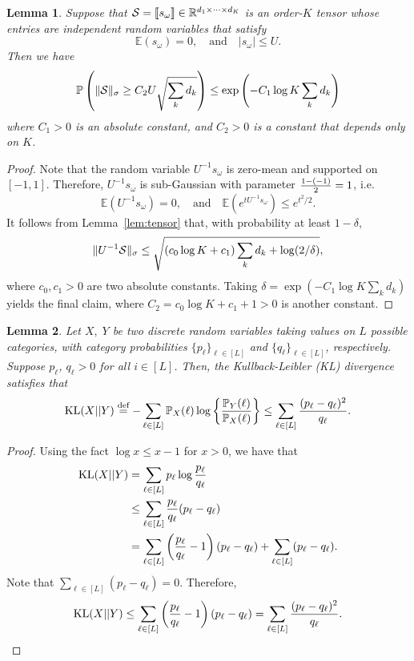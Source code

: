 \documentclass{article}
\theoremstyle{plain}
\newtheorem{lem}{Lemma}
\theoremstyle{definition}
\begin{document}
\begin{lem} \label{lem:noisytensor}
Suppose that $\mathcal{S}=\llbracket s_{\omega} \rrbracket\in\mathbb{R}^{d_1\times \cdots \times d_K}$ is an order-$K$ tensor whose entries are independent random variables that satisfy
\[
\mathbb{E}(s_{\omega})=0,\quad \text{and}\quad |s_{\omega}|\leq U.
\]
Then we have
\[
\mathbb{P}\left(\lVert\mathcal{S}\rVert_\sigma\geq C_2 U\sqrt{\sum_k d_k} \right)\leq \exp\left(-C_1  \log K \sum_k d_k\right)
\]
where $C_1>0$ is an absolute constant, and $C_2>0$ is a constant that depends only on $K$.
\end{lem}

\begin{proof}  Note that the random variable $U^{-1}s_{\omega}$ is zero-mean and supported on $[-1,1]$. Therefore, $U^{-1}s_{\omega}$ is sub-Gaussian with parameter ${1-(-1)\over 2}=1$, i.e.
\[
\mathbb{E}(U^{-1}s_{\omega})=0,\quad \text{and}\quad \mathbb{E}(e^{tU^{-1}s_{\omega}})\leq e^{t^2/2}.
\]
It follows from Lemma~\ref{lem:tensor} that, with probability at least $1-\delta$,
\[
\lVert U^{-1}\mathcal{S}\rVert_\sigma\leq \sqrt{\left(c_0\log K+c_1\right) \sum_k d_k +\log (2/\delta)},
\]
where $c_0, c_1>0$ are two absolute constants. Taking $\delta=\exp (-C_1\log K \sum_k d_k)$ yields the final claim, where $C_2=c_0\log K+c_1+1>0$ is another constant.
\end{proof}


\begin{lem}\label{lem:KLentry} Let $X,\; Y$ be two discrete random variables taking values on $L$ possible categories, with category probabilities $\{p_\ell\}_{\ell\in[L]}$ and $\{q_\ell\}_{\ell\in[L]}$, respectively.  Suppose $p_\ell$, $q_\ell>0$ for all $i\in[L]$. Then, the Kullback-Leibler (KL) divergence satisfies that
\[
\mathrm{KL}(X||Y)\stackrel{\text{def}}{=}-\sum_{\ell\in[L]}\mathbb{P}_X(\ell)\log\left\{{\mathbb{P}_Y(\ell)\over \mathbb{P}_X(\ell)}\right\} \leq \sum_{\ell \in [L]}{(p_\ell-q_\ell)^2 \over q_\ell}.
\]
\end{lem}
\begin{proof} Using the fact $\log x\leq x-1$ for $x>0$, we have that
\begin{align}\label{eq:KL}
\text{KL}(X||Y)&=\sum_{\ell\in[L]}p_\ell\log{p_\ell\over q_\ell}\\
&\leq \sum_{\ell\in[L]} {p_\ell\over q_\ell}(p_\ell-q_\ell)\\
&=\sum_{\ell\in[L]} \left({p_\ell\over q_\ell }- 1\right)(p_\ell-q_\ell)+ \sum_{\ell\in[L]} (p_\ell-q_\ell).
\end{align}
Note that $\sum_{\ell\in[L]}(p_\ell-q_\ell)=0$. Therefore,
\[
\text{KL}(X||Y)\leq \sum_{\ell\in[L]}\left( {p_\ell\over q_\ell}-1\right)\left(p_\ell-q_\ell\right)=\sum_{\ell\in[L]}{(p_\ell-q_\ell)^2\over q_\ell}.
\]
\end{proof}
\end{document}
